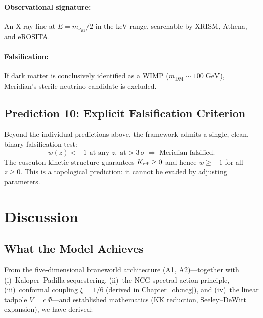 \paragraph{Observational signature:} An X-ray line at $E = m_{\nu_{R1}}/2$ in the keV range, searchable by XRISM, Athena, and eROSITA.

\paragraph{Falsification:} If dark matter is conclusively identified as a WIMP ($m_\mathrm{DM} \sim 100\;\mathrm{GeV}$), Meridian's sterile neutrino candidate is excluded.

\subsection{Prediction 10: Explicit Falsification Criterion}
\label{sec:1-pred10}

Beyond the individual predictions above, the framework admits a single, clean, binary falsification test:
\begin{equation}
\label{eq:1-phantom-falsification}
\boxed{w(z) < -1 \text{ at any }z,\;\text{at} > 3\,\sigma \;\Rightarrow\; \text{Meridian falsified.}}
\end{equation}
The cuscuton kinetic structure guarantees $K_{\mathrm{eff}} \geq 0$ and hence $w \geq -1$ for all $z \geq 0$. This is a topological prediction: it cannot be evaded by adjusting parameters.


\section{Discussion}
\label{sec:1-discussion}

\subsection{What the Model Achieves}
\label{sec:1-achievements}

From the five-dimensional braneworld architecture (A1, A2)---together with (i)~Kaloper--Padilla sequestering, (ii)~the NCG spectral action principle, (iii)~conformal coupling $\xi = 1/6$ (derived in Chapter~\ref{ch:ncg}), and (iv)~the linear tadpole $V = c\,\Phi$---and established mathematics (KK reduction, Seeley--DeWitt expansion), we have derived:

